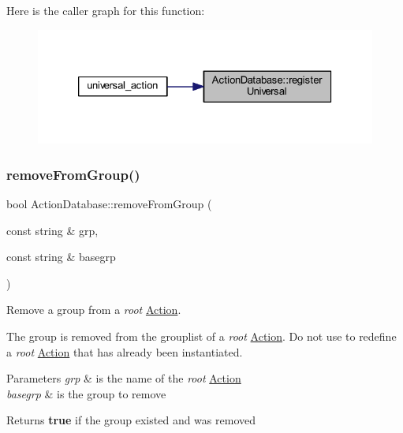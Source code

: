 Here is the caller graph for this function\+:
\nopagebreak
\begin{figure}[H]
\begin{center}
\leavevmode
\includegraphics[width=326pt]{class_action_database_a6793eb1aba4974cf863c3818f57a1bdd_icgraph}
\end{center}
\end{figure}
\mbox{\label{class_action_database_af5e2e83dbc5ec8baa906081101307c74}} 
\subsubsection{\texorpdfstring{removeFromGroup()}{removeFromGroup()}}
{\footnotesize\ttfamily bool Action\+Database\+::remove\+From\+Group (\begin{DoxyParamCaption}\item[{const string \&}]{grp,  }\item[{const string \&}]{basegrp }\end{DoxyParamCaption})}



Remove a group from a {\itshape root} \mbox{\hyperlink{class_action}{Action}}. 

The group is removed from the grouplist of a {\itshape root} \mbox{\hyperlink{class_action}{Action}}. Do not use to redefine a {\itshape root} \mbox{\hyperlink{class_action}{Action}} that has already been instantiated. 
\begin{DoxyParams}{Parameters}
{\em grp} & is the name of the {\itshape root} \mbox{\hyperlink{class_action}{Action}} \\
\hline
{\em basegrp} & is the group to remove \\
\hline
\end{DoxyParams}
\begin{DoxyReturn}{Returns}
{\bfseries{true}} if the group existed and was removed 
\end{DoxyReturn}


